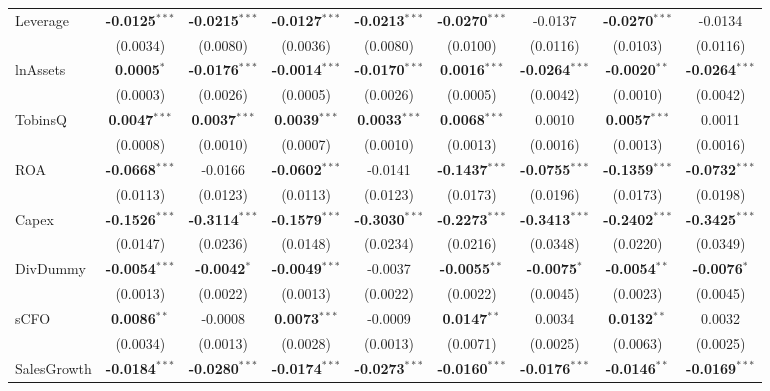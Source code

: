 \begin{landscape}
\begin{table}[H]
\begin{tabular}{lcccccccc}
\midrule
Leverage & \textbf{-0.0125}$^{***}$ & \textbf{-0.0215}$^{***}$ & \textbf{-0.0127}$^{***}$ & \textbf{-0.0213}$^{***}$ & \textbf{-0.0270}$^{***}$ & -0.0137 & \textbf{-0.0270}$^{***}$ & -0.0134 \\
 & (0.0034) & (0.0080) & (0.0036) & (0.0080) & (0.0100) & (0.0116) & (0.0103) & (0.0116) \\
lnAssets & \textbf{0.0005}$^{*}$ & \textbf{-0.0176}$^{***}$ & \textbf{-0.0014}$^{***}$ & \textbf{-0.0170}$^{***}$ & \textbf{0.0016}$^{***}$ & \textbf{-0.0264}$^{***}$ & \textbf{-0.0020}$^{**}$ & \textbf{-0.0264}$^{***}$ \\
 & (0.0003) & (0.0026) & (0.0005) & (0.0026) & (0.0005) & (0.0042) & (0.0010) & (0.0042) \\
TobinsQ & \textbf{0.0047}$^{***}$ & \textbf{0.0037}$^{***}$ & \textbf{0.0039}$^{***}$ & \textbf{0.0033}$^{***}$ & \textbf{0.0068}$^{***}$ & 0.0010 & \textbf{0.0057}$^{***}$ & 0.0011 \\
 & (0.0008) & (0.0010) & (0.0007) & (0.0010) & (0.0013) & (0.0016) & (0.0013) & (0.0016) \\
ROA & \textbf{-0.0668}$^{***}$ & -0.0166 & \textbf{-0.0602}$^{***}$ & -0.0141 & \textbf{-0.1437}$^{***}$ & \textbf{-0.0755}$^{***}$ & \textbf{-0.1359}$^{***}$ & \textbf{-0.0732}$^{***}$ \\
 & (0.0113) & (0.0123) & (0.0113) & (0.0123) & (0.0173) & (0.0196) & (0.0173) & (0.0198) \\
Capex & \textbf{-0.1526}$^{***}$ & \textbf{-0.3114}$^{***}$ & \textbf{-0.1579}$^{***}$ & \textbf{-0.3030}$^{***}$ & \textbf{-0.2273}$^{***}$ & \textbf{-0.3413}$^{***}$ & \textbf{-0.2402}$^{***}$ & \textbf{-0.3425}$^{***}$ \\
 & (0.0147) & (0.0236) & (0.0148) & (0.0234) & (0.0216) & (0.0348) & (0.0220) & (0.0349) \\
DivDummy & \textbf{-0.0054}$^{***}$ & \textbf{-0.0042}$^{*}$ & \textbf{-0.0049}$^{***}$ & -0.0037 & \textbf{-0.0055}$^{**}$ & \textbf{-0.0075}$^{*}$ & \textbf{-0.0054}$^{**}$ & \textbf{-0.0076}$^{*}$ \\
 & (0.0013) & (0.0022) & (0.0013) & (0.0022) & (0.0022) & (0.0045) & (0.0023) & (0.0045) \\
sCFO & \textbf{0.0086}$^{**}$ & -0.0008 & \textbf{0.0073}$^{***}$ & -0.0009 & \textbf{0.0147}$^{**}$ & 0.0034 & \textbf{0.0132}$^{**}$ & 0.0032 \\
 & (0.0034) & (0.0013) & (0.0028) & (0.0013) & (0.0071) & (0.0025) & (0.0063) & (0.0025) \\
SalesGrowth & \textbf{-0.0184}$^{***}$ & \textbf{-0.0280}$^{***}$ & \textbf{-0.0174}$^{***}$ & \textbf{-0.0273}$^{***}$ & \textbf{-0.0160}$^{***}$ & \textbf{-0.0176}$^{***}$ & \textbf{-0.0146}$^{**}$ & \textbf{-0.0169}$^{***}$ \\

\end{tabular}
\end{table}
\end{landscape}
